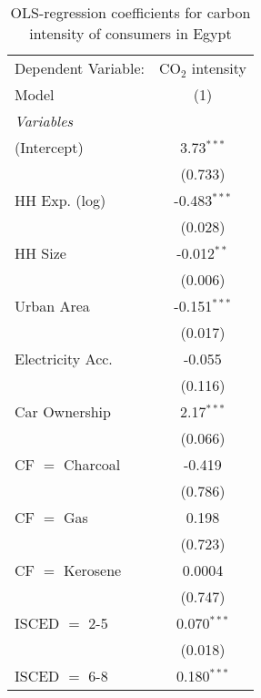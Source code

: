 
\begin{table}[htbp!]
   \centering
   \small
   \begin{adjustbox}{width = 1\textwidth, max height = 0.95\textheight, center}
      \begin{threeparttable}[b]
         \caption{\label{tab:OLS_1_EGY} OLS-regression coefficients for carbon intensity of consumers in Egypt}
         \begin{tabular}{lc}
            \tabularnewline \midrule \midrule
            Dependent Variable: & CO$_{2}$ intensity\\  
            Model               & (1)\\  
            \midrule
            \emph{Variables}\\
            (Intercept)         & 3.73$^{***}$\\   
                                & (0.733)\\   
            HH Exp. (log)       & -0.483$^{***}$\\   
                                & (0.028)\\   
            HH Size             & -0.012$^{**}$\\   
                                & (0.006)\\   
            Urban Area          & -0.151$^{***}$\\   
                                & (0.017)\\   
            Electricity Acc.    & -0.055\\   
                                & (0.116)\\   
            Car Ownership       & 2.17$^{***}$\\   
                                & (0.066)\\   
            CF $=$ Charcoal     & -0.419\\   
                                & (0.786)\\   
            CF $=$ Gas          & 0.198\\   
                                & (0.723)\\   
            CF $=$ Kerosene     & 0.0004\\   
                                & (0.747)\\   
            ISCED $=$ 2-5       & 0.070$^{***}$\\   
                                & (0.018)\\   
            ISCED $=$ 6-8       & 0.180$^{***}$\\   

\end{tabular}
\end{threeparttable}
\end{adjustbox}
\end{table}
